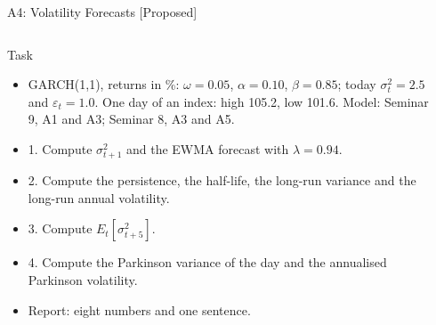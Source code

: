 \begin{frame}{A4: Volatility Forecasts [Proposed]}
\propsub
\itemsize{\scriptsize}
\begin{columns}[T]
\begin{column}{\taskw}
\begin{block}{Task}
\begin{itemize}
    \item GARCH(1,1), returns in \%: $\omega = 0.05$, $\alpha = 0.10$, $\beta = 0.85$; today $\sigma_t^2 = 2.5$ and $\varepsilon_t = 1.0$. One day of an index: high 105.2, low 101.6. Model: Seminar 9, A1 and A3; Seminar 8, A3 and A5.
    \item 1. Compute $\sigma_{t+1}^2$ and the EWMA forecast with $\lambda = 0.94$.
    \item 2. Compute the persistence, the half-life, the long-run variance and the long-run annual volatility.
    \item 3. Compute $E_t[\sigma_{t+5}^2]$.
    \item 4. Compute the Parkinson variance of the day and the annualised Parkinson volatility.
    \item Report: eight numbers and one sentence.
\end{itemize}
\end{block}
\end{column}
\begin{column}{\solw}
\end{column}
\end{columns}
\end{frame}

